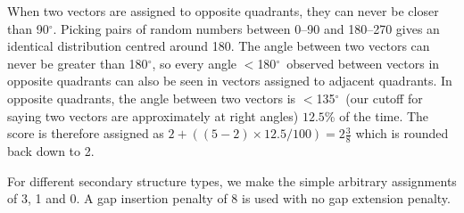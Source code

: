 \documentclass{article}
\newcommand{\degrees}{\mbox{${}^{\circ}$}}
\begin{document}

When two vectors are assigned to opposite quadrants, they can never be
closer than 90\degrees. Picking pairs of random numbers between 0--90
and 180--270 gives an identical distribution centred around 180. The
angle between two vectors can never be greater than 180\degrees, so
every angle $<$180\degrees\ observed between vectors in opposite
quadrants can also be seen in vectors assigned to adjacent quadrants.
In opposite quadrants, the angle between two vectors is
$<$135\degrees\ (our cutoff for saying two vectors are approximately
at right angles) $12.5$\% of the time. The score is therefore assigned
as $2+((5-2)\times 12.5/100) = 2\frac{3}{8}$ which is rounded back down
to 2.

For different secondary structure types, we make the simple arbitrary
assignments of 3, 1 and 0. A gap insertion penalty of 8 is used with
no gap extension penalty.

\end{document}
